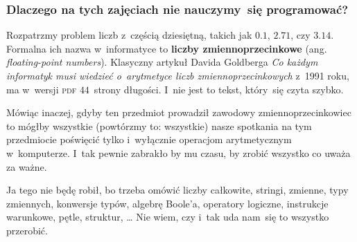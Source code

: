 \documentclass[10pt,t]{beamer}
\begin{document}
\begin{frame}
  \frametitle{Dlaczego na tych zajęciach nie nauczymy~się
    programować?}


  Rozpatrzmy problem liczb z~częścią dziesiętną, takich jak $0.1$, $2.71$,
  czy $3.14$. Formalna ich nazwa w~informatyce to \textbf{liczby
    zmiennoprzecinkowe} (ang. \textit{floating-point numbers}). Klasyczny
  artykuł Davida Goldberga
  {\textit{Co każdym informatyk musi wiedzieć o~arytmetyce liczb
      zmiennoprzecinkowych}} z~1991 roku, ma w~wersji \textsc{pdf}
  $44$~strony długości. I~nie jest to tekst, który~się czyta szybko.

  Mówiąc inaczej, gdyby ten przedmiot prowadził zawodowy
  zmiennoprzecinkowiec to mógłby \alert{wszystkie} (powtórzmy to:
  wszystkie) nasze spotkania na tym przedmiocie poświęcić tylko i~wyłącznie
  operacjom arytmetycznym w~komputerze. I~tak pewnie zabrakło by mu czasu,
  by zrobić wszystko co uważa za ważne.

  Ja tego nie będę robił, bo trzeba omówić liczby całkowite, stringi,
  zmienne, typy zmiennych, konwersje typów, algebrę Boole’a, operatory
  logiczne, instrukcje warunkowe, pętle, struktur, \ldots{} Nie wiem, czy i~tak
  uda nam~się to wszystko przerobić.

\end{frame}
\end{document}
